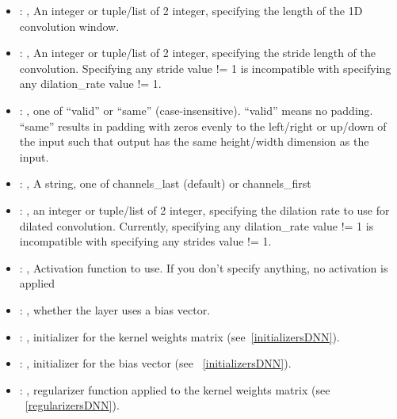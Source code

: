 \begin{itemize}
\begin{itemize}
        \item {}: , 
          An integer or tuple/list of 2 integer, specifying the length of the 1D convolution window.

        \item {}: , 
          An integer or tuple/list of 2 integer, specifying the stride length of the convolution.
          Specifying any stride value != 1 is incompatible with specifying any dilation\_rate value
          != 1.

        \item {}: , 
          one of ``valid'' or ``same'' (case-insensitive). ``valid'' means no padding. ``same''
          results in padding         with zeros evenly to the left/right or up/down of the input
          such that output has the same height/width         dimension as the input.

        \item {}: , 
          A string, one of channels\_last (default) or channels\_first

        \item {}: , 
          an integer or tuple/list of 2 integer, specifying the dilation rate to use for dilated
          convolution. Currently, specifying any dilation\_rate value != 1 is incompatible with
          specifying any         strides value != 1.

        \item {}: , 
          Activation function to use. If you don't specify anything, no activation is applied

        \item {}: , 
          whether the layer uses a bias vector.

        \item {}: , 
          initializer for the kernel weights matrix (see~\ref{initializersDNN}).

        \item {}: , 
          initializer for the bias vector (see ~\ref{initializersDNN}).

        \item {}: , 
          regularizer function applied to the kernel weights matrix (see ~\ref{regularizersDNN}).


\end{itemize}
\end{itemize}
